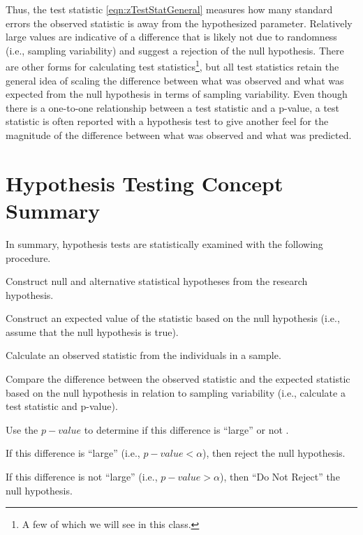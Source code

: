 \documentclass[10pt,openany]{book}\usepackage[]{graphicx}\usepackage[]{color}
\begin{document}
Thus, the test statistic \eqref{eqn:zTestStatGeneral} measures how many standard errors the observed statistic is away from the hypothesized parameter.  Relatively large values are indicative of a difference that is likely not due to randomness (i.e., sampling variability) and suggest a rejection of the null hypothesis.  There are other forms for calculating test statistics\footnote{A few of which we will see in this class.}, but all test statistics retain the general idea of scaling the difference between what was observed and what was expected from the null hypothesis in terms of sampling variability.  Even though there is a one-to-one relationship between a test statistic and a p-value, a test statistic is often reported with a hypothesis test to give another feel for the magnitude of the difference between what was observed and what was predicted.



\section{Hypothesis Testing Concept Summary}
In summary, hypothesis tests are statistically examined with the following procedure.
\begin{Enumerate}
  \item Construct null and alternative statistical hypotheses from the research hypothesis.
  \item Construct an expected value of the statistic based on the null hypothesis (i.e., assume that the null hypothesis is true).
  \item Calculate an observed statistic from the individuals in a sample.
  \item Compare the difference between the observed statistic and the expected statistic based on the null hypothesis in relation to sampling variability (i.e., calculate a test statistic and p-value).
  \item Use the $p-value$ to determine if this difference is ``large'' or not .
  \begin{Itemize}
    \item If this difference is ``large'' (i.e., $p-value<\alpha$), then reject the null hypothesis.
    \item If this difference is not ``large'' (i.e., $p-value>\alpha$), then ``Do Not Reject'' the null hypothesis.
  \end{Itemize}
\end{Enumerate}
\end{document}
